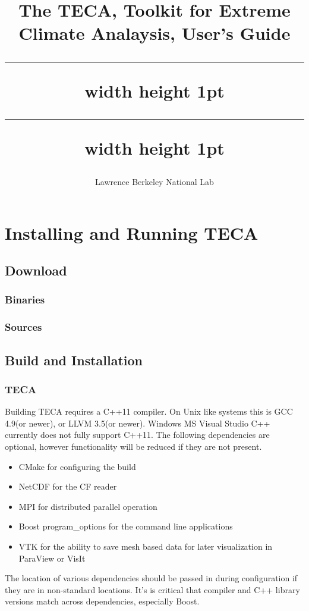 \documentclass[a4paper,10pt,DIV=12]{scrreprt}
\title{%
The TECA, Toolkit for Extreme Climate Analaysis, User's Guide \\ \vspace{3mm} %
\hrule width \hsize height 1pt \vspace{0.51mm} %
\hrule width \hsize height 1pt}
\subtitle{Lawrence Berkeley National Lab}
\author{}
\begin{document}
\maketitle


\tableofcontents

\chapter{Installing and Running TECA}
\section{Download}
\subsection{Binaries}
\subsection{Sources}
\section{Build and Installation}
\subsection{TECA}
Building TECA requires a C++11 compiler. On Unix like systems this is GCC
4.9(or newer), or LLVM 3.5(or newer). Windows MS Visual Studio C++ currently
does not fully support C++11. The following dependencies are optional, however functionality will be reduced if they are not present.

\begin{itemize}
\item CMake for configuring the build
\item NetCDF for the CF reader
\item MPI for distributed parallel operation
\item Boost program\_options for the command line applications
\item VTK for the ability to save mesh based data for later visualization in ParaView or VisIt
\end{itemize}

The location of various dependencies should be passed
in during configuration if they are in non-standard locations. It's is critical
that compiler and C++ library versions match across dependencies, especially Boost.
\end{document}
